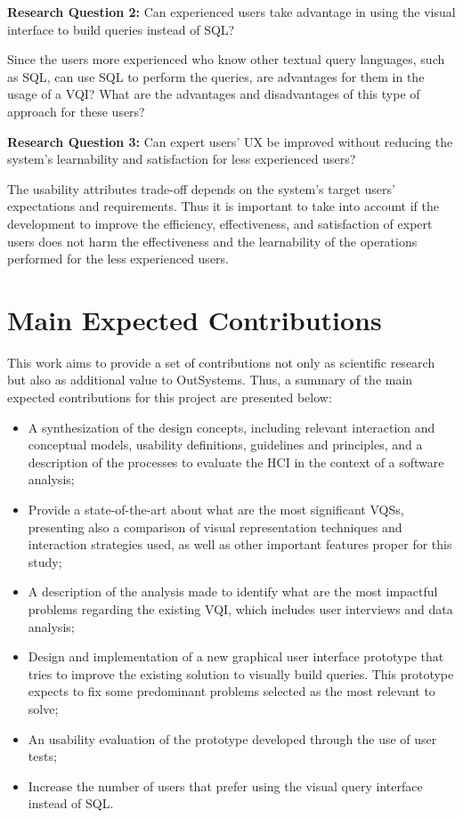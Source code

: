 \medskip

\textbf{Research Question 2:} Can experienced users take advantage in using the visual interface to build queries instead of \gls{SQL}?

\medskip

Since the users more experienced who know other textual query languages, such as \gls{SQL}, can use \gls{SQL} to perform the queries, are advantages for them in the usage of a \gls{VQI}? What are the advantages and disadvantages of this type of approach for these users?

\medskip

\textbf{Research Question 3:} Can expert users' \gls{UX} be improved without reducing the system's learnability and satisfaction for less experienced users?


\medskip

The usability attributes trade-off depends on the system's target users' expectations and requirements. Thus it is important to take into account if the development to improve the efficiency, effectiveness, and satisfaction of expert users does not harm the effectiveness and the learnability of the operations performed for the less experienced users.

\section{Main Expected Contributions}
\label{sec:main_exp_contributions}
This work aims to provide a set of contributions not only as scientific research but also as additional value to OutSystems. Thus, a summary of the main expected contributions for this project are presented below:

\begin{itemize}
  \item A synthesization of the design concepts, including relevant interaction and conceptual models, usability definitions, guidelines and principles, and a description of the processes to evaluate the \gls{HCI} in the context of a software analysis;
  \item Provide a state-of-the-art about what are the most significant \glspl{VQS}, presenting also a comparison of visual representation techniques and interaction strategies used, as well as other important features proper for this study;
  \item A description of the analysis made to identify what are the most impactful problems regarding the existing \gls{VQI}, which includes user interviews and data analysis;
  \item Design and implementation of a new graphical user interface prototype that tries to improve the existing solution to visually build queries. This prototype expects to fix some predominant problems selected as the most relevant to solve;
  \item An usability evaluation of the prototype developed through the use of user tests;
  \item Increase the number of users that prefer using the visual query interface instead of SQL.
\end{itemize} 

